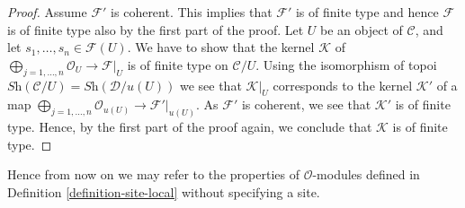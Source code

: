 \begin{proof}
\medskip\noindent
Assume $\mathcal{F}'$ is coherent. This implies that $\mathcal{F}'$
is of finite type and hence $\mathcal{F}$ is of finite type also by the
first part of the proof. Let $U$ be an object of $\mathcal{C}$, and let
$s_1, \ldots, s_n \in \mathcal{F}(U)$. We have to show that the kernel
$\mathcal{K}$ of
$\bigoplus_{j = 1, \ldots, n} \mathcal{O}_U \to \mathcal{F}|_U$
is of finite type on $\mathcal{C}/U$. Using the isomorphism of topoi
$\textit{Sh}(\mathcal{C}/U) = \textit{Sh}(\mathcal{D}/u(U))$
we see that $\mathcal{K}|_{U}$ corresponds to the kernel
$\mathcal{K}'$ of a map
$\bigoplus_{j = 1, \ldots, n} \mathcal{O}_{u(U)} \to \mathcal{F}'|_{u(U)}$.
As $\mathcal{F}'$ is coherent, we see that $\mathcal{K}'$ is of finite
type. Hence, by the first part of the proof again, we conclude
that $\mathcal{K}$ is of finite type.
\end{proof}

\noindent
Hence from now on we may refer to the properties of $\mathcal{O}$-modules
defined in Definition \ref{definition-site-local} without specifying a site.

